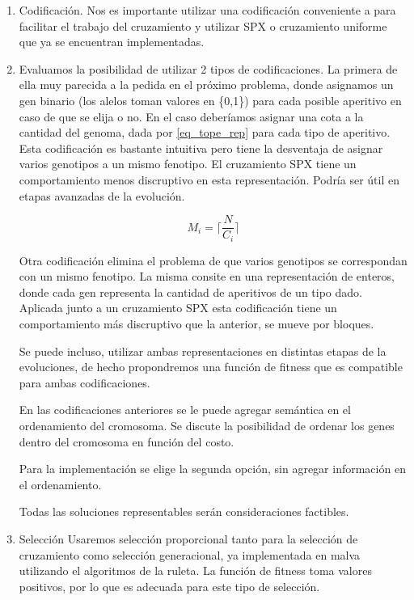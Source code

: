 \documentclass[9pt,conference]{IEEEtran}
\begin{document}
	\begin{enumerate}
		\item Codificaci\'on.
		Nos es importante utilizar una codificaci\'on conveniente a para facilitar el trabajo del cruzamiento y utilizar SPX o cruzamiento uniforme que ya se encuentran implementadas.

		\item Evaluamos la posibilidad de utilizar 2 tipos de codificaciones.
			La primera de ella muy parecida a la pedida en el pr\'oximo problema, donde asignamos un gen binario (los alelos toman valores en \{0,1\}) para cada posible aperitivo en caso de que se elija o no. En el caso deber\'iamos asignar una cota a la cantidad del genoma, dada por \ref{eq_tope_rep} para cada tipo de aperitivo. Esta codificaci\'on es bastante intuitiva pero tiene la desventaja de asignar varios genotipos a un mismo fenotipo. El cruzamiento SPX tiene un comportamiento menos discruptivo en esta representaci\'on. Podr\'ia ser \'util en etapas avanzadas de la evoluci\'on.

			\begin{equation}
			\label{eqn_tope_req}
			M_i = \lceil \frac{N}{C_i} \rceil
			\end{equation}

			Otra codificaci\'on elimina el problema de que varios genotipos se correspondan con un mismo fenotipo. La misma consite en una representaci\'on de enteros, donde cada gen representa la cantidad de aperitivos de un tipo dado. Aplicada junto a un cruzamiento SPX esta codificaci\'on tiene un comportamiento m\'as discruptivo que la anterior, se mueve por bloques.

			Se puede incluso, utilizar ambas representaciones en distintas etapas de la evoluciones, de hecho propondremos una funci\'on de fitness que es {compatible} para ambas codificaciones.

			En las codificaciones anteriores se le puede agregar sem\'antica en el ordenamiento del cromosoma. Se discute la posibilidad de ordenar los genes dentro del cromosoma en funci\'on del costo.

			Para la implementaci\'on se elige la segunda opci\'on, sin agregar informaci\'on en el ordenamiento.
		
		Todas las soluciones representables ser\'an consideraciones factibles.

	\item Selecci\'on
		Usaremos selecci\'on proporcional tanto para la selecci\'on de cruzamiento como selecci\'on generacional, ya implementada en malva utilizando el algoritmos de la ruleta. La funci\'on de fitness toma valores positivos, por lo que es adecuada para este tipo de selecci\'on.


\end{enumerate}
\end{document}
